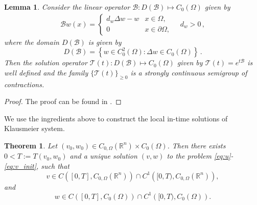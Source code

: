 \documentclass[11pt, a4paper]{article}
\theoremstyle{break}
\newtheorem{thm}{Theorem}[section]
\theoremstyle{break}
\theoremstyle{break}
\theoremstyle{break}
\theoremstyle{break}
\newtheorem{lem}{Lemma}[section]
\theoremstyle{break}
\theoremstyle{break}
\theoremstyle{break}
\theoremstyle{break}
\begin{document}
\begin{lem}
    \label{lem:B_SEMIGROUP_GENERATOR}
    Consider the linear operator $\mathcal{B}: D(\mathcal{B}) \mapsto C_0(\Omega)$ given by 
    \begin{align}
        \label{EQ:B_OPERATOR_DEFINITION}
        \mathcal{B} w (x) = 
        \begin{cases}
            d_w \Delta w - w &x \in \Omega, \\
            0 &x \in \partial \Omega, 
        \end{cases} \quad d_w > 0 \,, 
    \end{align}
    where the domain $D(\mathcal{B})$ is given by
    \begin{equation}
        \label{EQ:B_DOMAIN_DEFINITION}
        D(\mathcal{B}) = \left\{ w \in C^2_0(\Omega): \Delta w \in C_0(\Omega) \right\}\,.
    \end{equation}
    Then the solution operator $\mathcal{T}(t): D(\mathcal{B}) \mapsto C_0(\Omega)$ given by $\mathcal{T}(t) = e^{t\mathcal{B}}$ is well defined and the family $\{\mathcal{T}(t)\}_{\geq 0}$ is a strongly continuous semigroup of contractions.
\end{lem}
\begin{proof}
    The proof can be found in  \cite[Theorem 6.1.8]{Arendt2001}.
\end{proof}
We use the ingredients above to construct the local in-time solutions of Klausmeier system.
\begin{thm}
    \label{thm:Well-Posedness}
    Let $(v_0, w_0) \in C_{0, \Omega}(\mathbb{R}^n) \times C_0(\Omega)$. Then there exists $0 < T := T(v_0, w_0)$ and a unique solution $(v, w)$ to the problem \eqref{eq:u}-\eqref{eq:v_init}, such that
    \begin{equation}
        v \in C\left([0, T], C_{0, \Omega}(\mathbb{R}^n)\right) \cap C^1\left([0, T), C_{0, \Omega}(\mathbb{R}^n)\right),
    \end{equation}
    and
    \begin{equation}
        w \in C\left([0, T], C_0(\Omega)\right) \cap C^1\left([0, T), C_0(\Omega)\right).
    \end{equation}
\end{thm}
\end{document}
